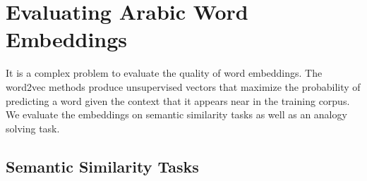 \section{Evaluating Arabic Word Embeddings}
\label{sec:evaluation}


It is a complex problem to evaluate the quality of word embeddings. The word2vec methods produce unsupervised vectors that maximize the probability of predicting a word given the context that it appears near in the training corpus. We evaluate the embeddings on semantic similarity tasks as well as an analogy solving task. 

\subsection{Semantic Similarity Tasks}

